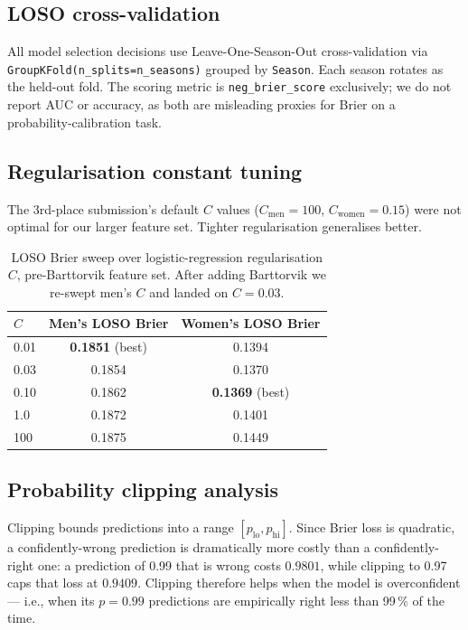 \documentclass[11pt, a4paper]{article}
\begin{document}
\subsection{LOSO cross-validation}
All model selection decisions use Leave-One-Season-Out cross-validation via \texttt{GroupKFold(n\_splits=n\_seasons)} grouped by \texttt{Season}. Each season rotates as the held-out fold. The scoring metric is \texttt{neg\_brier\_score} exclusively; we do not report AUC or accuracy, as both are misleading proxies for Brier on a probability-calibration task.

\subsection{Regularisation constant tuning}
\label{sec:hparam}

The 3rd-place submission's default $C$ values ($C_{\text{men}} = 100$, $C_{\text{women}} = 0.15$) were not optimal for our larger feature set. Tighter regularisation generalises better.

\begin{table}[H]
\centering
\begin{tabular}{@{}lcc@{}}
\toprule
$C$ & \textbf{Men's LOSO Brier} & \textbf{Women's LOSO Brier} \\
\midrule
0.01  & \textbf{0.1851} (best) & 0.1394 \\
0.03  & 0.1854 & 0.1370 \\
0.10  & 0.1862 & \textbf{0.1369} (best) \\
1.0   & 0.1872 & 0.1401 \\
100   & 0.1875 & 0.1449 \\
\bottomrule
\end{tabular}
\caption{LOSO Brier sweep over logistic-regression regularisation $C$, pre-Barttorvik feature set. After adding Barttorvik we re-swept men's $C$ and landed on $C = 0.03$.}
\end{table}

\subsection{Probability clipping analysis}
\label{sec:clipping}

Clipping bounds predictions into a range $[p_{\text{lo}}, p_{\text{hi}}]$. Since Brier loss is quadratic, a confidently-wrong prediction is dramatically more costly than a confidently-right one: a prediction of 0.99 that is wrong costs $0.9801$, while clipping to 0.97 caps that loss at $0.9409$. Clipping therefore helps when the model is overconfident --- i.e., when its $p = 0.99$ predictions are empirically right less than 99\,\% of the time.
\end{document}
